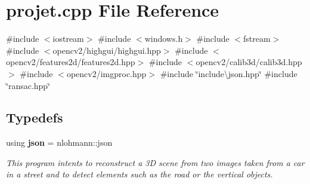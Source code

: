 \section{projet.\+cpp File Reference}
\label{projet_8cpp}
{\ttfamily \#include $<$iostream$>$}\newline
{\ttfamily \#include $<$windows.\+h$>$}\newline
{\ttfamily \#include $<$fstream$>$}\newline
{\ttfamily \#include $<$opencv2/highgui/highgui.\+hpp$>$}\newline
{\ttfamily \#include $<$opencv2/features2d/features2d.\+hpp$>$}\newline
{\ttfamily \#include $<$opencv2/calib3d/calib3d.\+hpp$>$}\newline
{\ttfamily \#include $<$opencv2/imgproc.\+hpp$>$}\newline
{\ttfamily \#include \char`\"{}include\textbackslash{}json.\+hpp\char`\"{}}\newline
{\ttfamily \#include \char`\"{}ransac.\+hpp\char`\"{}}\newline
\subsection*{Typedefs}
\begin{DoxyCompactItemize}
\item 
using \textbf{ json} = nlohmann\+::json
\begin{DoxyCompactList}\small\item\em This program intents to reconstruct a 3D scene from two images taken from a car in a street and to detect elements such as the road or the vertical objects. \end{DoxyCompactList}\end{DoxyCompactItemize}
